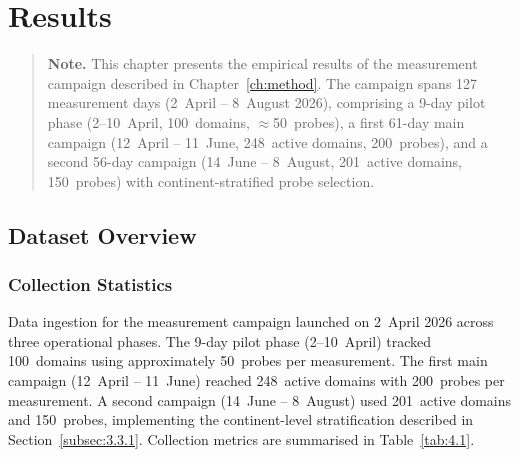 \chapter{Results}
\label{ch:results}

\begin{quote}
\textbf{Note.} This chapter presents the empirical results of the measurement campaign described in Chapter~\ref{ch:method}. The campaign spans 127 measurement days (2~April -- 8~August 2026), comprising a 9-day pilot phase (2--10~April, 100~domains, $\approx$50~probes), a first 61-day main campaign (12~April -- 11~June, 248~active domains, 200~probes), and a second 56-day campaign (14~June -- 8~August, 201~active domains, 150~probes) with continent-stratified probe selection.
\end{quote}

\bigskip
\section{Dataset Overview}
\label{sec:4.1}

\subsection{Collection Statistics}
\label{subsec:4.1.1}

Data ingestion for the measurement campaign launched on 2~April 2026 across three operational phases. The 9-day pilot phase (2--10~April) tracked 100~domains using approximately 50~probes per measurement. The first main campaign (12~April -- 11~June) reached 248~active domains with 200~probes per measurement. A second campaign (14~June -- 8~August) used 201~active domains and 150~probes, implementing the continent-level stratification described in Section~\ref{subsec:3.3.1}. Collection metrics are summarised in Table~\ref{tab:4.1}.


